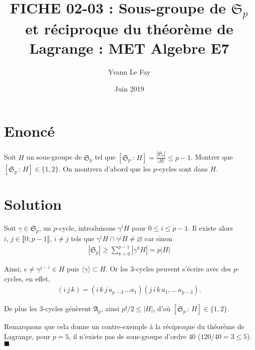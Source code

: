 \documentclass{article}
\newcommand*{\QED}{\hfill\ensuremath{\blacksquare}}%
\begin{document}
\title{FICHE 02-03 : Sous-groupe de $\mathfrak{S}_p$ et réciproque du théorème de Lagrange : MET Algebre E7}
\author{Yvann Le Fay}
\date{Juin 2019}
\maketitle
\section*{Enoncé}
Soit $H$ un sous-groupe de $\mathfrak{S}_p$ tel que $[\mathfrak{S}_p\, : \, H] = \frac{|\mathfrak{S}_p|}{|H|}\leq p-1$. Montrer que $[\mathfrak{S}_p\, : \, H] \in \{1,2\}$. On montrera d'abord que les $p$-cycles sont dans $H$.
\section*{Solution}
Soit $\gamma\in\mathfrak{S}_p$, un $p$-cycle, introduisons $\gamma^i H$ pour $0\leq i \leq p-1$. Il existe alors $i,\,j\in \llbracket 0;p-1\rrbracket,\, i\neq j$ tels que $\gamma^i H \cap \gamma^j H\neq \varnothing$ car sinon
\begin{align*}
|\mathfrak{S}_p|\geq \sum_{k=0}^{p-1}|\gamma^k H| = p|H|
\end{align*}

Ainsi, $e\neq \gamma^{j-i}\in H$ puis $\langle \gamma\rangle \subset H$. Or les $3$-cycles peuvent s'écrire avec des $p$-cycles, en effet, 
\begin{align*}
(i \, j \, k) = (i\, k\, j \, a_{p-3}\, \ldots a_1)(j\, i\, k\, a_1,\ldots\, a_{p-3}).
\end{align*}

De plus les $3$-cycles génèrent $\mathfrak{A}_p$, ainsi $p!/2\leq |H|$, d'où $[\mathfrak{S}_p\, :\, H] \in \{1,2\}$. 

Remarquons que cela donne un contre-exemple à la réciproque du théorème de Lagrange, pour $p=5$, il n'existe pas de sous-groupe d'ordre $40$ ($120/40=3\leq 5$). 
\QED
\end{document}
